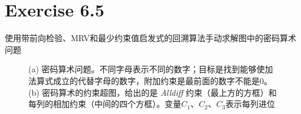 \documentclass{article}
\begin{document}
\section{Exercise 6.5}
使用带前向检验、MRV和最少约束值启发式的回溯算法手动求解图中的密码算术问题
\begin{figure}[h]
    {
        \centering
        \caption{}
    }
    (a) 密码算术问题。不同字母表示不同的数字；目标是找到能够使加法算式成立的代替字母的数字，附加约束是最前面的数字不能是0。 (b) 密码算术的约束超图，给出的是 \textit{Alldiff} 约束（最上方的方框）和每列的相加约束（中间的四个方框）。变量$C_1$、$C_2$、$C_3$表示每列进位
\end{figure}
\end{document}
